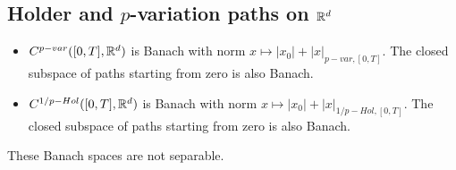 \subsection{Holder and $p$-variation paths on $\mathbb{R}^d$}

\begin{theorem}
    \begin{itemize}
        \item $C^{p-var}([0,T], \mathbb{R}^d)$ is Banach with norm $x \mapsto |x_0| + |x|_{p-var,[0,T]}.$ The closed subspace of paths starting from zero is also Banach.
        \item $C^{1/p-Hol}([0,T], \mathbb{R}^d)$ is Banach with norm  $x \mapsto |x_0| + |x|_{1/p-Hol,[0,T]}.$ The closed subspace of paths starting from zero is also Banach.
    \end{itemize}
    These Banach spaces are not separable.
\end{theorem}

